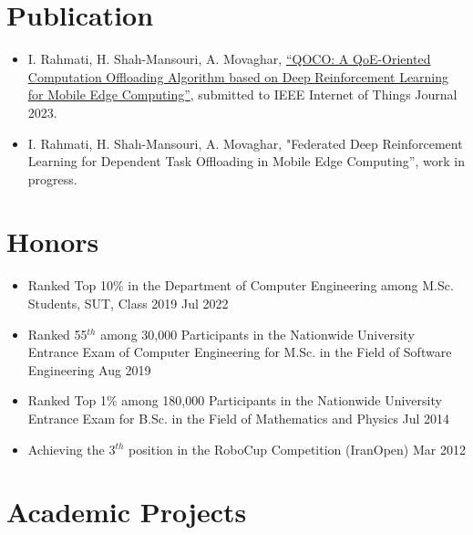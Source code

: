 \documentclass[11pt]{article}
\begin{document}
  
  \section {Publication}
  
  \begin{itemize}
  	
  	\item I. Rahmati, H. Shah-Mansouri, A. Movaghar, \href{https://arxiv.org/pdf/2311.02525.pdf}{``QOCO: A QoE-Oriented Computation Offloading Algorithm based on Deep Reinforcement Learning for Mobile Edge Computing''}, submitted to IEEE Internet of Things Journal 2023.
  	\href{https://arxiv.org/pdf/2311.02525.pdf}{\small  \faExternalLink}
  	\href{https://github.com/ImanRHT/QOCO}{\faGithub}
  	
  	\item I. Rahmati, H. Shah-Mansouri, A. Movaghar, "Federated Deep Reinforcement Learning for Dependent Task Offloading in Mobile Edge Computing'', work in progress.
  	
  \end{itemize}

\section{Honors}
\begin{itemize}
	\renewcommand\labelitemi{\ding{118}}
	\item{Ranked Top 10\% in the Department of Computer Engineering among M.Sc. Students, SUT, Class 2019 \hfill Jul 2022}\vspace{-2mm}
	\item {Ranked 55$^{th}$ among 30,000 Participants in the Nationwide University Entrance Exam of Computer Engineering for M.Sc. in the Field of Software Engineering \hfill Aug 2019}\vspace{-2mm}
	\item{Ranked Top 1\% among 180,000 Participants in the Nationwide University Entrance Exam for B.Sc. in the Field of Mathematics and Physics  \hfill Jul 2014}\vspace{-2mm}
	\item{Achieving the 3$^{th}$ position in the RoboCup Competition (IranOpen)  \hfill Mar 2012}\vspace{-2mm}
\end{itemize}


\section{Academic Projects}
\end{document}
